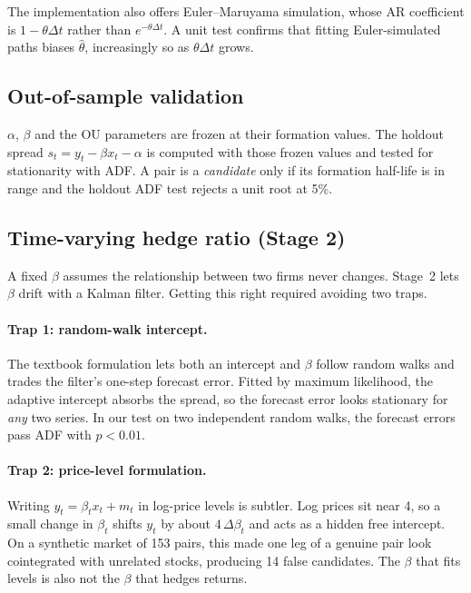 \documentclass[11pt]{article}
\begin{document}
The implementation also offers Euler--Maruyama simulation, whose AR coefficient is
$1-\theta\Delta t$ rather than $e^{-\theta\Delta t}$. A unit test confirms that fitting
Euler-simulated paths biases $\hat\theta$, increasingly so as $\theta\Delta t$ grows.

\subsection{Out-of-sample validation}

$\alpha$, $\beta$ and the OU parameters are frozen at their formation values. The holdout
spread $s_t = y_t-\beta x_t-\alpha$ is computed with those frozen values and tested for
stationarity with ADF. A pair is a \emph{candidate} only if its formation half-life is in
range and the holdout ADF test rejects a unit root at 5\%.

\subsection{Time-varying hedge ratio (Stage 2)}

A fixed $\beta$ assumes the relationship between two firms never changes. Stage~2 lets
$\beta$ drift with a Kalman filter. Getting this right required avoiding two traps.

\paragraph{Trap 1: random-walk intercept.} The textbook formulation lets both an intercept
and $\beta$ follow random walks and trades the filter's one-step forecast error. Fitted by
maximum likelihood, the adaptive intercept absorbs the spread, so the forecast error looks
stationary for \emph{any} two series. In our test on two independent random walks, the
forecast errors pass ADF with $p<0.01$.

\paragraph{Trap 2: price-level formulation.} Writing $y_t=\beta_t x_t + m_t$ in log-price
levels is subtler. Log prices sit near 4, so a small change in $\beta_t$ shifts $y_t$ by about
$4\,\Delta\beta_t$ and acts as a hidden free intercept. On a synthetic market of 153 pairs,
this made one leg of a genuine pair look cointegrated with unrelated stocks, producing 14
false candidates. The $\beta$ that fits levels is also not the $\beta$ that hedges returns.
\end{document}
